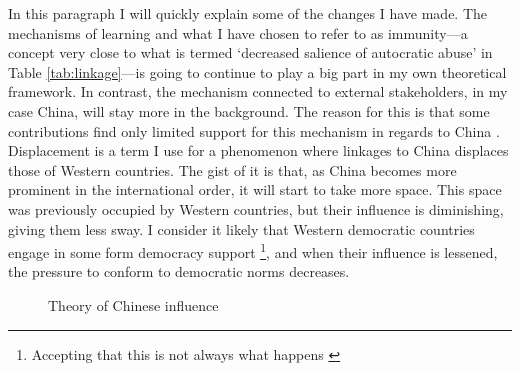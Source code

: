 In this paragraph I will quickly explain some of the changes I have made. The mechanisms of learning and what I have chosen to refer to as immunity---a concept very close to what is termed `decreased salience of autocratic abuse' in Table \ref{tab:linkage}---is going to continue to play a big part in my own theoretical framework. In contrast, the mechanism connected to external stakeholders, in my case China, will stay more in the background. The reason for this is that some contributions find only limited support for this mechanism in regards to China \citep{chen_democracy_2015}. Displacement is a term I use for a phenomenon where linkages to China displaces those of Western countries. The gist of it is that, as China becomes more prominent in the international order, it will start to take more space. This space was previously occupied by Western countries, but their influence is diminishing, giving them less sway. I consider it likely that Western democratic countries engage in some form democracy support \citep{levitsky_linkage_2006}\footnote{Accepting that this is not always what happens \citep{chen_democracy_2015, wong_chinese_2019}}, and when their influence is lessened, the pressure to conform to democratic norms decreases.

\begin{figure}[!hbt]
\centering
{}%
\caption{Theory of Chinese influence}
\label{fig:theory}
\end{figure}

